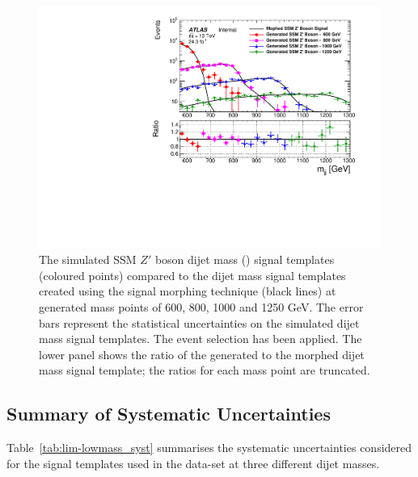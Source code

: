 \begin{figure}[!htb]
\begin{center}
  \includegraphics[width=0.9\linewidth, angle=0]{figs/Dibjet/LowMass/lim-morphing_mine.pdf} 
\end{center}
\vspace{-2em}
\caption[Simulated SSM $Z'$ boson dijet mass signal templates and dijet mass signal templates
  created using the signal morphing technique used in the \lm{} data-set limit setting phase.]
        {The simulated SSM $Z'$ boson dijet mass (\mjj) signal templates (coloured points) compared to the
          dijet mass signal templates created using the signal morphing technique (black lines)
          at generated mass points of 600, 800, 1000 and 1250 GeV.
          The error bars represent the statistical uncertainties on the simulated dijet mass signal templates.
          The \lm{} event selection has been applied.
          The lower panel shows the ratio of the generated to the morphed dijet mass signal template; the ratios for each mass point are truncated.
          \label{fig:lim-full_morphing}}
\end{figure}

\FloatBarrier
\vspace{2em}
\subsection{Summary of Systematic Uncertainties}
\label{sec:lim-full_systs}

Table~\ref{tab:lim-lowmass_syst} summarises the systematic uncertainties considered for the
signal templates used in the \lm{} data-set at three different dijet masses.

